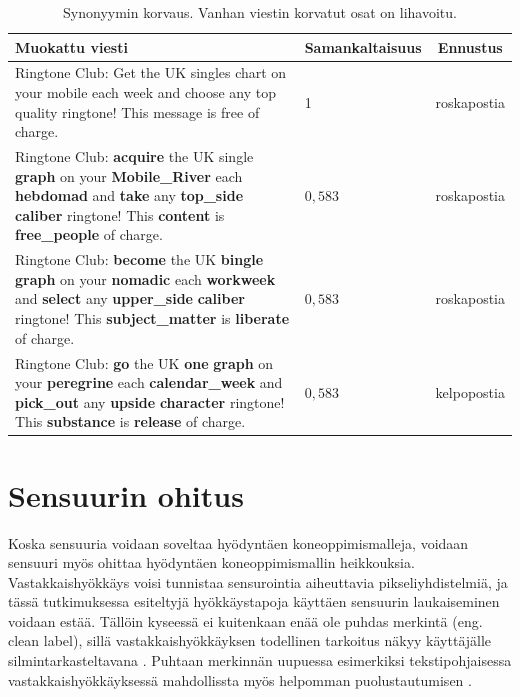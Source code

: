 \begin{table}[t]
  \begin{tabularx}{\textwidth}{| X | l | c |}
    \hline
    Muokattu viesti                                                                                                                                                                                                                                            & Samankaltaisuus & Ennustus    \\
    \hline
    Ringtone Club: Get the UK singles chart on your mobile each week and choose any top quality ringtone! This message is free of charge.                                                                                                                      & 1                        & roskapostia \\
    \hline
    Ringtone Club: \textbf{acquire} the UK single \textbf{graph} on your \textbf{Mobile\_River} each \textbf{hebdomad} and \textbf{take} any \textbf{top\_side} \textbf{caliber} ringtone! This \textbf{content} is \textbf{free\_people} of charge.           & $0,583$                  & roskapostia \\
    \hline
    Ringtone Club: \textbf{become} the UK \textbf{bingle} \textbf{graph} on your \textbf{nomadic} each \textbf{workweek} and \textbf{select} any \textbf{upper\_side} \textbf{caliber} ringtone! This \textbf{subject\_matter} is \textbf{liberate} of charge. & $0,583$                  & roskapostia \\
    \hline
    Ringtone Club: \textbf{go} the UK \textbf{one} \textbf{graph} on your \textbf{peregrine} each \textbf{calendar\_week} and \textbf{pick\_out} any \textbf{upside} \textbf{character} ringtone! This \textbf{substance} is \textbf{release} of charge.       & $0,583$                  & kelpopostia \\
    \hline
  \end{tabularx}
  \caption{Synonyymin korvaus. Vanhan viestin korvatut osat on lihavoitu. \citep{spamfilter}}
\end{table}

\section{Sensuurin ohitus}
Koska sensuuria voidaan soveltaa hyödyntäen koneoppimismalleja, voidaan sensuuri myös ohittaa hyödyntäen koneoppimismallin heikkouksia. Vastakkaishyökkäys voisi tunnistaa sensurointia aiheuttavia pikseliyhdistelmiä, ja tässä tutkimuksessa esiteltyjä hyökkäystapoja käyttäen sensuurin laukaiseminen voidaan estää. Tällöin kyseessä ei kuitenkaan enää ole puhdas merkintä (eng. clean label), sillä vastakkaishyökkäyksen todellinen tarkoitus näkyy käyttäjälle silmintarkasteltavana \citep{triggerless}. Puhtaan merkinnän uupuessa esimerkiksi tekstipohjaisessa vastakkaishyökkäyksessä mahdollissta myös helpomman puolustautumisen \citep{pruthi2019}.

